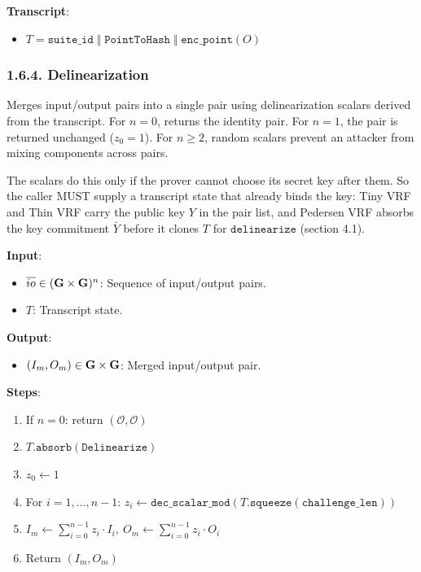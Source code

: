\documentclass[
]{article}
\providecommand{\tightlist}{%
  \setlength{\itemsep}{0pt}\setlength{\parskip}{0pt}}
\begin{document}
\textbf{Transcript}:

\begin{itemize}
\tightlist
\item
  \(T = \texttt{suite\_id} \;\Vert\; \texttt{PointToHash} \;\Vert\; \texttt{enc\_point}(O)\)
\end{itemize}

\subsubsection{1.6.4. Delinearization}\label{delinearization}

Merges input/output pairs into a single pair using delinearization
scalars derived from the transcript. For \(n = 0\), returns the identity
pair. For \(n = 1\), the pair is returned unchanged (\(z_0 = 1\)). For
\(n \geq 2\), random scalars prevent an attacker from mixing components
across pairs.

The scalars do this only if the prover cannot choose its secret key
after them. So the caller MUST supply a transcript state that already
binds the key: Tiny VRF and Thin VRF carry the public key \(Y\) in the
pair list, and Pedersen VRF absorbs the key commitment \(\bar{Y}\)
before it clones \(T\) for \(\texttt{delinearize}\) (section 4.1).

\textbf{Input}:

\begin{itemize}
\tightlist
\item
  \(\overline{io} \in (\bold{G}\times \bold{G})^n\): Sequence of
  input/output pairs.
\item
  \(T\): Transcript state.
\end{itemize}

\textbf{Output}:

\begin{itemize}
\tightlist
\item
  \((I_m, O_m) \in \bold{G}\times \bold{G}\): Merged input/output pair.
\end{itemize}

\textbf{Steps}:

\begin{enumerate}
\def\labelenumi{\arabic{enumi}.}
\tightlist
\item
  If \(n = 0\): return \((\mathcal{O}, \mathcal{O})\)
\item
  \(T.\texttt{absorb}(\texttt{Delinearize})\)
\item
  \(z_0 \gets 1\)
\item
  For \(i = 1, \ldots, n-1\):
  \(z_i \gets \texttt{dec\_scalar\_mod}(T.\texttt{squeeze}(\texttt{challenge\_len}))\)
\item
  \(I_m \gets \sum_{i=0}^{n-1} z_i \cdot I_i,\ O_m \gets \sum_{i=0}^{n-1} z_i \cdot O_i\)
\item
  Return \((I_m, O_m)\)
\end{enumerate}
\end{document}
